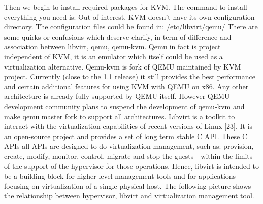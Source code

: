 Then we begin to install required packages for KVM. The command to install everything you need is:
Out of interest, KVM doesn’t have its own configuration directory. The configuration files could be found in: /etc/libvirt/qemu/
There are some quirks or confusions which deserve clarify, in term of difference and association between libvirt, 
qemu, qemu-kvm. Qemu in fact is project independent of KVM, it is an emulator which itself could be used as a virtualization 
alternative. Qemu-kvm is fork of QEMU maintained by KVM project. Currently (close to the 1.1 release) it still provides the best 
performance and certain additional features for using KVM with QEMU on x86. Any other architecture is already fully supported by QEMU itself. However QEMU development community plans to suspend the development of qemu-kvm and make qemu master fork to support all architectures. Libvirt is a toolkit to interact with the virtualization capabilities of recent versions of Linux [23]. It is an open-source project and provides a set of long term stable C API. These C APIs all APIs are designed to do virtualization management, such as: provision, create, modify, monitor, control, migrate and stop the guests - within the limits of the support of the hypervisor for those operations. Hence, libvirt is intended to be a building block for higher level management tools and for applications focusing on virtualization of a single physical host. The following picture shows the relationship between hypervisor, libvirt and virtualization management tool. 

